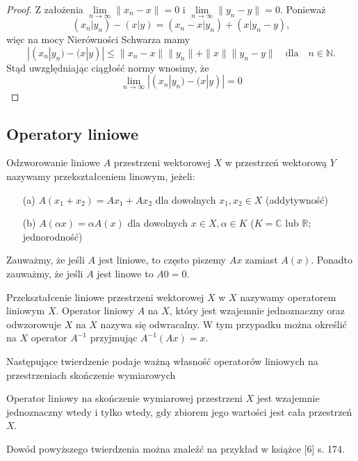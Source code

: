 \documentclass[leqno]{article}
\begin{document}
\begin{justify}
\begin{proof}
    Z założenia \(\lim\limits_{n\to\infty}\|x_n-x\|=0\) i \(\lim\limits_{n\to\infty}\|y_n-y\|=0\). 
    Ponieważ 
    \[
        (x_n|y_n)-(x|y)= (x_n-x|y_n)+ (x|y_n-y),
    \]
    więc na mocy Nierówności Schwarza mamy
    \[
        |(x_n|y_n)-(x|y)|\leq\|x_n-x\|\|y_n\|+\|x\|\|y_n-y\|\quad \text{dla} \quad n\in\mathbb{N}.
    \]
    Stąd uwzględniając ciągłość normy wnosimy, że
    \[
        \lim_{n\to\infty}|(x_n|y_n)-(x|y)|=0
    \] 
\end{proof}

\subsection{Operatory liniowe}
\begin{defn}
    Odzworowanie liniowe \(A\) przestrzeni wektorowej \(X\) w przestrzeń wektorową \(Y\) nazywamy przekształceniem linowym, jeżeli:
    \begin{enumerate}
        \item [(a)] \(A(x_1+x_2)=Ax_1+Ax_2\) dla dowolnych \(x_1,x_2\in X\) (addytywność)
        \item [(b)] \(A(\alpha x)=\alpha A(x)\) dla dowolnych \(x\in X, \alpha \in K\) (\(K=\mathbb{C}\text{ lub }\mathbb{R}\); jednorodność)
    \end{enumerate}
    Zauważmy, że jeśli \(A\) jest liniowe, to często piszemy \(Ax\) zamiast \(A(x)\). Ponadto zauważmy, że jeśli \(A\) jest linowe to \(A0=0\).
\end{defn}

\begin{defn}
    Przekształcenie liniowe przestrzeni wektorowej \(X\) w \(X\) nazywamy operatorem liniowym \(X\). 
    Operator liniowy \(A\) na \(X\), który jest wzajemnie jednoznaczny oraz odwzorowuje \(X\) na \(X\) nazywa się odwracalny. 
    W tym przypadku można określić na \(X\) operator \(A^{-1}\) przyjmując \(A^{-1}(Ax)=x\).
\end{defn}

Następujące twierdzenie podaje ważną własność operatorów liniowych na przestrzeniach skończenie wymiarowych

\begin{theorem}
{
    Operator liniowy na skończenie wymiarowej przestrzeni \(X\) jest wzajemnie jednoznaczny 
    wtedy i tylko wtedy, gdy zbiorem jego wartości jest cała przestrzeń \(X\).
}
\end{theorem}

Dowód powyższego twierdzenia można znaleźć na przykład w książce [6] s. 174.


\end{justify}
\end{document}
